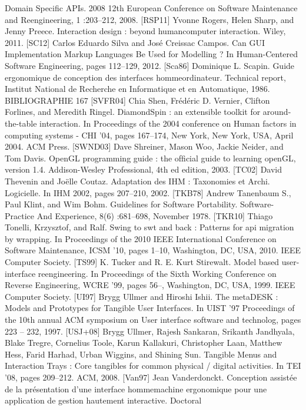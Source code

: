 \documentclass{article}
\begin{document}
Domain Speciﬁc APIs. 2008 12th European Conference on Software Maintenance and
Reengineering, 1 :203–212, 2008.
[RSP11]
Yvonne Rogers, Helen Sharp, and Jenny Preece. Interaction design : beyond humancomputer interaction. Wiley, 2011.
[SC12]
Carlos Eduardo Silva and Jos\'{e} Creissac Campos. Can GUI Implementation Markup
Languages Be Used for Modelling ? In Human-Centered Software Engineering, pages
112–129, 2012.
[Sca86]
Dominique L. Scapin.
Guide ergonomique de conception des interfaces hommeordinateur.
Technical report, Institut National de Recherche en Informatique et en
Automatique, 1986.
BIBLIOGRAPHIE
167
[SVFR04]
Chia Shen, Fr\'{e}d\'{e}ric D. Vernier, Clifton Forlines, and Meredith Ringel. DiamondSpin :
an extensible toolkit for around-the-table interaction. In Proceedings of the 2004 conference on Human factors in computing systems - CHI ’04, pages 167–174, New York,
New York, USA, April 2004. ACM Press.
[SWND03]
Dave Shreiner, Mason Woo, Jackie Neider, and Tom Davis. OpenGL programming
guide : the ofﬁcial guide to learning openGL, version 1.4. Addison-Wesley Professional, 4th ed edition, 2003.
[TC02]
David Thevenin and Jo\"{e}lle Coutaz. Adaptation des IHM : Taxonomies et Archi. Logicielle. In IHM 2002, pages 207–210, 2002.
[TKB78]
Andrew Tanenbaum S., Paul Klint, and Wim Bohm. Guidelines for Software Portability. Software-Practice And Experience, 8(6) :681–698, November 1978.
[TKR10]
Thiago Tonelli, Krzysztof, and Ralf. Swing to swt and back : Patterns for api migration
by wrapping. In Proceedings of the 2010 IEEE International Conference on Software
Maintenance, ICSM ’10, pages 1–10, Washington, DC, USA, 2010. IEEE Computer
Society.
[TS99]
K. Tucker and R. E. Kurt Stirewalt. Model based user-interface reengineering.
In
Proceedings of the Sixth Working Conference on Reverse Engineering, WCRE ’99,
pages 56–, Washington, DC, USA, 1999. IEEE Computer Society.
[UI97]
Brygg Ullmer and Hiroshi Ishii. The metaDESK : Models and Prototypes for Tangible
User Interfaces. In UIST ’97 Proceedings of the 10th annual ACM symposium on User
interface software and technolog, pages 223 – 232, 1997.
[USJ+08]
Brygg Ullmer, Rajesh Sankaran, Srikanth Jandhyala, Blake Tregre, Cornelius Toole,
Karun Kallakuri, Christopher Laan, Matthew Hess, Farid Harhad, Urban Wiggins, and
Shining Sun. Tangible Menus and Interaction Trays : Core tangibles for common physical / digital activities. In TEI ’08, pages 209–212. ACM, 2008.
[Van97]
Jean Vanderdonckt. Conception assist\'{e}e de la pr\'{e}sentation d’une interface hommemachine ergonomique pour une application de gestion hautement interactive. Doctoral
\end{document}
